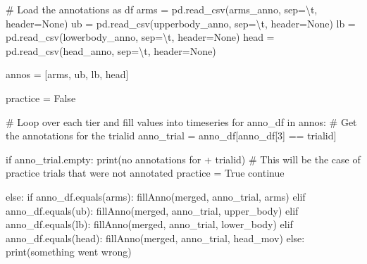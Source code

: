 \documentclass[
  letterpaper,
  DIV=11,
  numbers=noendperiod]{scrreprt}
\newenvironment{Shaded}{\begin{snugshade}}{\end{snugshade}}
\newcommand{\BuiltInTok}[1]{\textcolor[rgb]{0.00,0.23,0.31}{#1}}
\newcommand{\CharTok}[1]{\textcolor[rgb]{0.13,0.47,0.30}{#1}}
\newcommand{\CommentTok}[1]{\textcolor[rgb]{0.37,0.37,0.37}{#1}}
\newcommand{\ControlFlowTok}[1]{\textcolor[rgb]{0.00,0.23,0.31}{#1}}
\newcommand{\DecValTok}[1]{\textcolor[rgb]{0.68,0.00,0.00}{#1}}
\newcommand{\KeywordTok}[1]{\textcolor[rgb]{0.00,0.23,0.31}{#1}}
\newcommand{\NormalTok}[1]{\textcolor[rgb]{0.00,0.23,0.31}{#1}}
\newcommand{\OperatorTok}[1]{\textcolor[rgb]{0.37,0.37,0.37}{#1}}
\newcommand{\StringTok}[1]{\textcolor[rgb]{0.13,0.47,0.30}{#1}}
\newcommand{\VariableTok}[1]{\textcolor[rgb]{0.07,0.07,0.07}{#1}}
\begin{document}
\begin{Shaded}
\begin{Highlighting}[]
    \CommentTok{\# Load the annotations as df}
\NormalTok{    arms }\OperatorTok{=}\NormalTok{ pd.read\_csv(arms\_anno, sep}\OperatorTok{=}\StringTok{\textquotesingle{}}\CharTok{\textbackslash{}t}\StringTok{\textquotesingle{}}\NormalTok{, header}\OperatorTok{=}\VariableTok{None}\NormalTok{)}
\NormalTok{    ub }\OperatorTok{=}\NormalTok{ pd.read\_csv(upperbody\_anno, sep}\OperatorTok{=}\StringTok{\textquotesingle{}}\CharTok{\textbackslash{}t}\StringTok{\textquotesingle{}}\NormalTok{, header}\OperatorTok{=}\VariableTok{None}\NormalTok{)}
\NormalTok{    lb }\OperatorTok{=}\NormalTok{ pd.read\_csv(lowerbody\_anno, sep}\OperatorTok{=}\StringTok{\textquotesingle{}}\CharTok{\textbackslash{}t}\StringTok{\textquotesingle{}}\NormalTok{, header}\OperatorTok{=}\VariableTok{None}\NormalTok{)}
\NormalTok{    head }\OperatorTok{=}\NormalTok{ pd.read\_csv(head\_anno, sep}\OperatorTok{=}\StringTok{\textquotesingle{}}\CharTok{\textbackslash{}t}\StringTok{\textquotesingle{}}\NormalTok{, header}\OperatorTok{=}\VariableTok{None}\NormalTok{)}

\NormalTok{    annos }\OperatorTok{=}\NormalTok{ [arms, ub, lb, head]}

\NormalTok{    practice }\OperatorTok{=} \VariableTok{False}

    \CommentTok{\# Loop over each tier and fill values into timeseries}
    \ControlFlowTok{for}\NormalTok{ anno\_df }\KeywordTok{in}\NormalTok{ annos:}
        \CommentTok{\# Get the annotations for the trialid}
\NormalTok{        anno\_trial }\OperatorTok{=}\NormalTok{ anno\_df[anno\_df[}\DecValTok{3}\NormalTok{] }\OperatorTok{==}\NormalTok{ trialid] }
        
        \ControlFlowTok{if}\NormalTok{ anno\_trial.empty:}
            \BuiltInTok{print}\NormalTok{(}\StringTok{\textquotesingle{}no annotations for \textquotesingle{}} \OperatorTok{+}\NormalTok{ trialid)  }\CommentTok{\# This will be the case of practice trials that were not annotated}
\NormalTok{            practice }\OperatorTok{=} \VariableTok{True}
            \ControlFlowTok{continue}
        
        \ControlFlowTok{else}\NormalTok{:}
            \ControlFlowTok{if}\NormalTok{ anno\_df.equals(arms):}
\NormalTok{                fillAnno(merged, anno\_trial, }\StringTok{\textquotesingle{}arms\textquotesingle{}}\NormalTok{)}
            \ControlFlowTok{elif}\NormalTok{ anno\_df.equals(ub):}
\NormalTok{                fillAnno(merged, anno\_trial, }\StringTok{\textquotesingle{}upper\_body\textquotesingle{}}\NormalTok{)}
            \ControlFlowTok{elif}\NormalTok{ anno\_df.equals(lb):}
\NormalTok{                fillAnno(merged, anno\_trial, }\StringTok{\textquotesingle{}lower\_body\textquotesingle{}}\NormalTok{)}
            \ControlFlowTok{elif}\NormalTok{ anno\_df.equals(head):}
\NormalTok{                fillAnno(merged, anno\_trial, }\StringTok{\textquotesingle{}head\_mov\textquotesingle{}}\NormalTok{)}
            \ControlFlowTok{else}\NormalTok{:}
                \BuiltInTok{print}\NormalTok{(}\StringTok{\textquotesingle{}something went wrong\textquotesingle{}}\NormalTok{)}


\end{Highlighting}
\end{Shaded}
\end{document}
